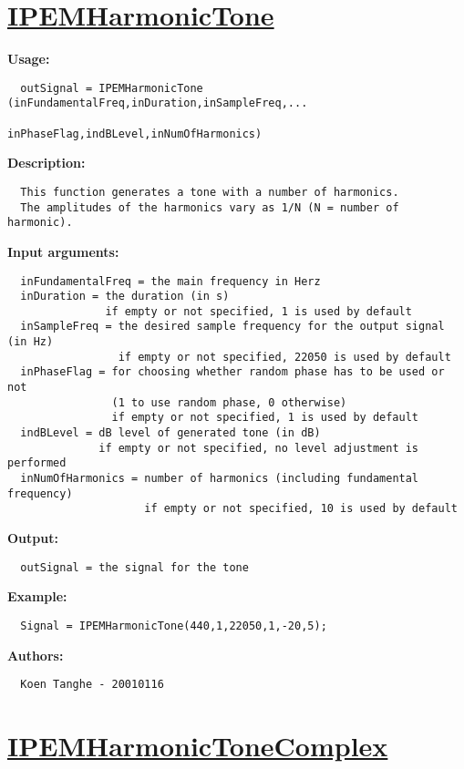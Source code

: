 \newpage
\section*{\hyperlink{Concepts:IPEMHarmonicTone}{IPEMHarmonicTone}}
\hypertarget{FuncRef:IPEMHarmonicTone}{}

\textbf{Usage:}
\begin{verbatim}  outSignal = IPEMHarmonicTone (inFundamentalFreq,inDuration,inSampleFreq,...
                                inPhaseFlag,indBLevel,inNumOfHarmonics)

\end{verbatim}
\textbf{Description:}
\begin{verbatim}  This function generates a tone with a number of harmonics.
  The amplitudes of the harmonics vary as 1/N (N = number of harmonic).

\end{verbatim}
\textbf{Input arguments:}
\begin{verbatim}  inFundamentalFreq = the main frequency in Herz
  inDuration = the duration (in s)
               if empty or not specified, 1 is used by default
  inSampleFreq = the desired sample frequency for the output signal (in Hz)
                 if empty or not specified, 22050 is used by default
  inPhaseFlag = for choosing whether random phase has to be used or not
                (1 to use random phase, 0 otherwise)
                if empty or not specified, 1 is used by default
  indBLevel = dB level of generated tone (in dB)
              if empty or not specified, no level adjustment is performed
  inNumOfHarmonics = number of harmonics (including fundamental frequency)
                     if empty or not specified, 10 is used by default

\end{verbatim}
\textbf{Output:}
\begin{verbatim}  outSignal = the signal for the tone

\end{verbatim}
\textbf{Example:}
\begin{verbatim}  Signal = IPEMHarmonicTone(440,1,22050,1,-20,5);

\end{verbatim}
\textbf{Authors:}
\begin{verbatim}  Koen Tanghe - 20010116
\end{verbatim}


\newpage
\section*{\hyperlink{Concepts:IPEMHarmonicToneComplex}{IPEMHarmonicToneComplex}}
\hypertarget{FuncRef:IPEMHarmonicToneComplex}{}

